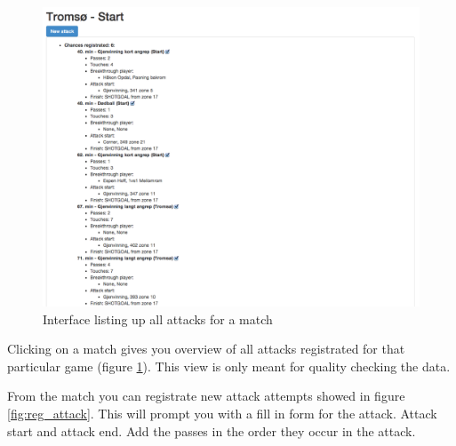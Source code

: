 \begin{figure}[ht!]
\centering
\includegraphics[width=1\textwidth]{images/general/all_attacks.png}
\caption{Interface listing up all attacks for a match}
\label{fig:all_attacks}
\end{figure}

Clicking on a match gives you overview of all attacks registrated for that particular game (figure \ref{fig:all_attacks}). This view is only meant for quality checking the data.

From the match you can registrate new attack attempts showed in figure \ref{fig:reg_attack}. This will prompt you with a fill in form for the attack. Attack start and attack end. Add the passes in the order they occur in the attack. 

